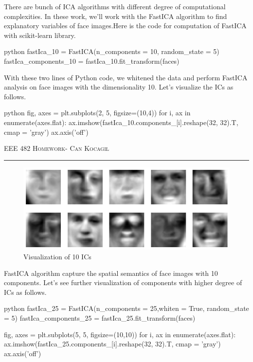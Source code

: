 \documentclass[12pt]{amsart}
\begin{document}
\bigskip
There are bunch of ICA algorithms with different degree of computational complexities. In these work, we'll work with the FastICA algorithm to find explanatory variables of face images.Here is the code for computation of FastICA with scikit-learn library.


\begin{mintedbox}{python}
fastIca_10 = FastICA(n_components = 10, random_state = 5)
fastIca_components_10 = fastIca_10.fit_transform(faces)
\end{mintedbox}

With these two lines of Python code, we whitened the data and perform FastICA analysis on face images with the dimensionality 10. Let's visualize the ICs as follows.
\begin{mintedbox}{python}
fig, axes = plt.subplots(2, 5, figsize=(10,4))
for i, ax in enumerate(axes.flat):
    ax.imshow(fastIca_10.components_[i].reshape(32, 32).T, cmap = 'gray')
    ax.axis('off')
\end{mintedbox}


\newpage
{\scshape EEE 482} \hfill {\scshape \large  Homework-\relax} \hfill {\scshape Can Kocagil}
\smallskip
\hrule
\vspace{2mm}

\begin{figure}[h]
    \centering
        \includegraphics[width=0.7\linewidth,height=0.7\textheight,keepaspectratio]{images/Q1/fastICA_10_components.png}
        \caption{Visualization of 10 ICs}
\end{figure}

FastICA algorithm capture the spatial semantics of face images with 10 components. Let's see further visualization of  components with higher degree of ICs as follows.

\begin{mintedbox}{python}
fastIca_25 = FastICA(n_components = 25,whiten = True, random_state = 5)
fastIca_components_25 = fastIca_25.fit_transform(faces)


fig, axes = plt.subplots(5, 5, figsize=(10,10))
for i, ax in enumerate(axes.flat):
    ax.imshow(fastIca_25.components_[i].reshape(32, 32).T, cmap = 'gray')
    ax.axis('off')
\end{mintedbox}
\end{document}

